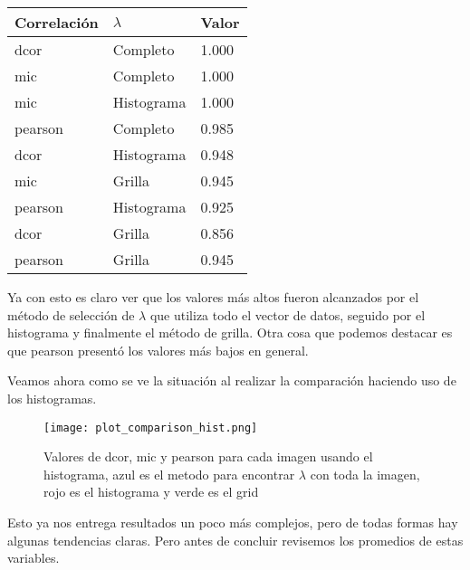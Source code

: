     \begin{table}[H]
        \centering
        \begin{tabular}{|l|l|l|}
            \hline
        Correlaci\'on    & $\lambda$ & Valor  \\    \hline
        dcor    & Completo    & 1.000  \\
        mic     & Completo    & 1.000  \\
        mic     & Histograma  & 1.000  \\
        pearson & Completo    & 0.985 \\
        dcor    & Histograma  & 0.948 \\
        mic     & Grilla      & 0.945  \\
        pearson & Histograma  & 0.925  \\
        dcor    & Grilla      & 0.856  \\
        pearson & Grilla      & 0.945  \\     \hline

        \end{tabular}
    \end{table}

    Ya con esto es claro ver que los valores m\'as altos fueron alcanzados por el m\'etodo de selecci\'on de $\lambda$ que utiliza todo el vector de datos, seguido por el histograma y finalmente el m\'etodo de grilla. Otra cosa que podemos destacar es que pearson present\'o los valores m\'as bajos en general.

    Veamos ahora como se ve la situaci\'on al realizar la comparaci\'on haciendo uso de los histogramas.

    \begin{figure}[H]
        \centering
        \texttt{[image: plot\_comparison\_hist.png]}
        \caption{Valores de dcor, mic y pearson para cada imagen usando el histograma, azul es el metodo para encontrar $\lambda$ con toda la imagen, rojo es el histograma y verde es el grid}
    \end{figure}

    Esto ya nos entrega resultados un poco m\'as complejos, pero de todas formas hay algunas tendencias claras. Pero antes de concluir revisemos los promedios de estas variables.

